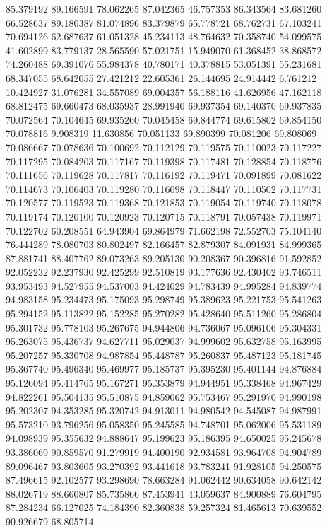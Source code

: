 85.379192
89.166591
78.062265
87.042365
46.757353
86.343564
83.681260
66.528637
89.180387
81.074896
83.379879
65.778721
68.762731
67.103241
70.694126
62.687637
61.051328
45.234113
48.764632
70.358740
54.099575
41.602899
83.779137
28.565590
57.021751
15.949070
61.368452
38.868572
74.260488
69.391076
55.984378
40.780171
40.378815
53.051391
55.231681
68.347055
68.642055
27.421212
22.605361
26.144695
24.914442
6.761212
10.424927
31.076281
34.557089
69.004357
56.188116
41.626956
47.162118
68.812475
69.660473
68.035937
28.991940
69.937354
69.140370
69.937835
70.072564
70.104645
69.935260
70.045458
69.844774
69.615802
69.854150
70.078816
9.908319
11.630856
70.051133
69.890399
70.081206
69.808069
70.086667
70.078636
70.100692
70.112129
70.119575
70.110023
70.117227
70.117295
70.084203
70.117167
70.119398
70.117481
70.128854
70.118776
70.111656
70.119628
70.117817
70.116192
70.119471
70.091899
70.081622
70.114673
70.106403
70.119280
70.116098
70.118447
70.110502
70.117731
70.120577
70.119523
70.119368
70.121853
70.119054
70.119740
70.118078
70.119174
70.120100
70.120923
70.120715
70.118791
70.057438
70.119971
70.122702
60.208551
64.943904
69.864979
71.662198
72.552703
75.104140
76.444289
78.080703
80.802497
82.166457
82.879307
84.091931
84.999365
87.881741
88.407762
89.073263
89.205130
90.208367
90.396816
91.592852
92.052232
92.237930
92.425299
92.510819
93.177636
92.430402
93.746511
93.953493
94.527955
94.537003
94.424029
94.783439
94.995284
94.839774
94.983158
95.234473
95.175093
95.298749
95.389623
95.221753
95.541263
95.294152
95.113822
95.152285
95.270282
95.428640
95.511260
95.286804
95.301732
95.778103
95.267675
94.944806
94.736067
95.096106
95.304331
95.263075
95.436737
94.627711
95.029037
94.999602
95.632758
95.163995
95.207257
95.330708
94.987854
95.448787
95.260837
95.487123
95.181745
95.367740
95.496340
95.469977
95.185737
95.395230
95.401144
94.876884
95.126094
95.414765
95.167271
95.353879
94.944951
95.338468
94.967429
94.822261
95.504135
95.510875
94.859062
95.753467
95.291970
94.990198
95.202307
94.353285
95.320742
94.913011
94.980542
94.545087
94.987991
95.573210
93.796256
95.058350
95.245585
94.748701
95.062006
95.531189
94.098939
95.355632
94.888647
95.199623
95.186395
94.650025
95.245678
93.386069
90.859570
91.279919
94.400190
92.934581
93.964708
94.904789
89.096467
93.803605
93.270392
93.441618
93.783241
91.928105
94.250575
87.496615
92.102577
93.298690
78.663284
91.062442
90.634058
90.642142
88.026719
88.660807
85.735866
87.453941
43.059637
84.900889
76.604795
87.284234
66.127025
74.184390
82.360838
59.257324
81.465613
70.639552
90.926679
68.805714
